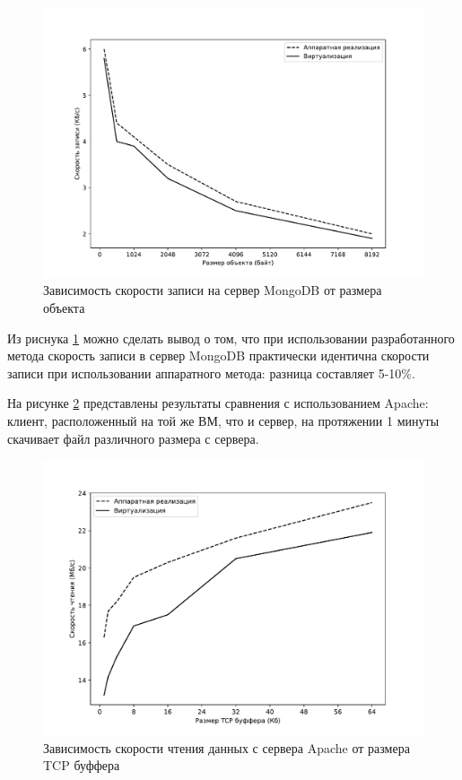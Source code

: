 \begin{figure}[h]
	\centering
	\includegraphics[width=\textwidth]{img/system-1.pdf}
	\caption{Зависимость скорости записи на сервер MongoDB от размера объекта}
	\label{fig:system-1}
\end{figure}

Из риснука \ref{fig:system-1} можно сделать вывод о том, что при использовании разработанного метода скорость записи в сервер MongoDB практически идентична скорости записи при использовании аппаратного метода: разница составляет 5-10\%.

На рисунке \ref{fig:system-2} представлены результаты сравнения с использованием Apache: клиент, расположенный на той же ВМ, что и сервер, на протяжении 1 минуты скачивает файл различного размера с сервера.

\begin{figure}[h]
	\centering
	\includegraphics[width=\textwidth]{img/system-2.pdf}
	\caption{Зависимость скорости чтения данных с сервера Apache от размера TCP буффера}
	\label{fig:system-2}
\end{figure}

